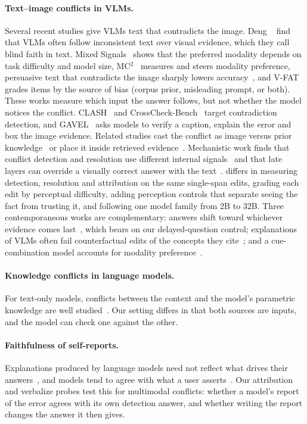 \paragraph{Text--image conflicts in VLMs.}
Several recent studies give VLMs text that contradicts the image. Deng \etal~\cite{deng2025words} find that VLMs often follow inconsistent text over visual evidence, which they call blind faith in text. Mixed Signals~\cite{pezeshkpour2025mixed} shows that the preferred modality depends on task difficulty and model size, MC$^2$~\cite{zhang2025mc2} measures and steers modality preference, persuasive text that contradicts the image sharply lowers accuracy~\cite{zhang2026images}, and V-FAT~\cite{wang2026vfat} grades items by the source of bias (corpus prior, misleading prompt, or both). These works measure which input the answer follows, but not whether the model notices the conflict. CLASH~\cite{popordanoska2025clash} and CrossCheck-Bench~\cite{tian2026crosscheck} target contradiction detection, and GAVEL~\cite{gao2026gavel} asks models to verify a caption, explain the error and box the image evidence. Related studies cast the conflict as image versus prior knowledge~\cite{chen2026cdhbench,wang2026dobench} or place it inside retrieved evidence~\cite{catapang2026cmcbench}. Mechanistic work finds that conflict detection and resolution use different internal signals~\cite{nguyen2025challenges} and that late layers can override a visually correct answer with the text~\cite{li2026mllms}. \name differs in measuring detection, resolution and attribution on the same single-span edits, grading each edit by perceptual difficulty, adding perception controls that separate seeing the fact from trusting it, and following one model family from 2B to 32B. Three contemporaneous works are complementary: answers shift toward whichever evidence comes last~\cite{li2026noncommutativity}, which bears on our delayed-question control; explanations of VLMs often fail counterfactual edits of the concepts they cite~\cite{ding2026edct}; and a cue-combination model accounts for modality preference~\cite{barua2026bayesian}.

\paragraph{Knowledge conflicts in language models.}
For text-only models, conflicts between the context and the model's parametric knowledge are well studied~\cite{longpre2021entity,xie2024adaptive,xu2024knowledge}. Our setting differs in that both sources are inputs, and the model can check one against the other.

\paragraph{Faithfulness of self-reports.}
Explanations produced by language models need not reflect what drives their answers~\cite{turpin2023language,lanham2023measuring}, and models tend to agree with what a user asserts~\cite{sharma2024towards}. Our attribution and verbalize probes test this for multimodal conflicts: whether a model's report of the error agrees with its own detection answer, and whether writing the report changes the answer it then gives.
